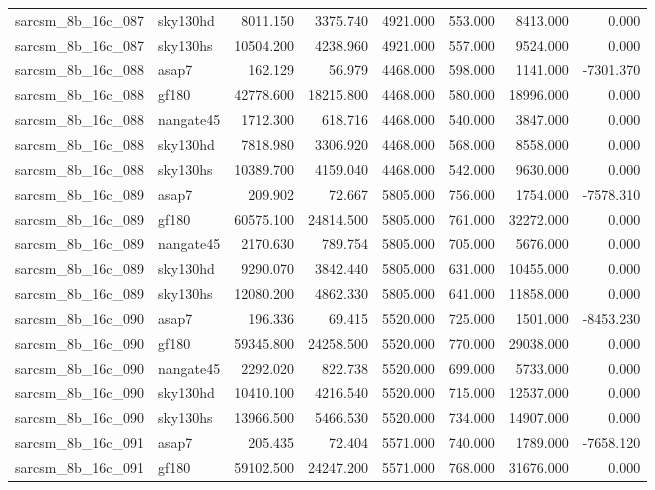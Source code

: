 \begin{tabular}{llrrrrrr}
sarcsm\_8b\_16c\_087 & sky130hd & 8011.150 & 3375.740 & 4921.000 & 553.000 & 8413.000 & 0.000 \\
sarcsm\_8b\_16c\_087 & sky130hs & 10504.200 & 4238.960 & 4921.000 & 557.000 & 9524.000 & 0.000 \\
sarcsm\_8b\_16c\_088 & asap7 & 162.129 & 56.979 & 4468.000 & 598.000 & 1141.000 & -7301.370 \\
sarcsm\_8b\_16c\_088 & gf180 & 42778.600 & 18215.800 & 4468.000 & 580.000 & 18996.000 & 0.000 \\
sarcsm\_8b\_16c\_088 & nangate45 & 1712.300 & 618.716 & 4468.000 & 540.000 & 3847.000 & 0.000 \\
sarcsm\_8b\_16c\_088 & sky130hd & 7818.980 & 3306.920 & 4468.000 & 568.000 & 8558.000 & 0.000 \\
sarcsm\_8b\_16c\_088 & sky130hs & 10389.700 & 4159.040 & 4468.000 & 542.000 & 9630.000 & 0.000 \\
sarcsm\_8b\_16c\_089 & asap7 & 209.902 & 72.667 & 5805.000 & 756.000 & 1754.000 & -7578.310 \\
sarcsm\_8b\_16c\_089 & gf180 & 60575.100 & 24814.500 & 5805.000 & 761.000 & 32272.000 & 0.000 \\
sarcsm\_8b\_16c\_089 & nangate45 & 2170.630 & 789.754 & 5805.000 & 705.000 & 5676.000 & 0.000 \\
sarcsm\_8b\_16c\_089 & sky130hd & 9290.070 & 3842.440 & 5805.000 & 631.000 & 10455.000 & 0.000 \\
sarcsm\_8b\_16c\_089 & sky130hs & 12080.200 & 4862.330 & 5805.000 & 641.000 & 11858.000 & 0.000 \\
sarcsm\_8b\_16c\_090 & asap7 & 196.336 & 69.415 & 5520.000 & 725.000 & 1501.000 & -8453.230 \\
sarcsm\_8b\_16c\_090 & gf180 & 59345.800 & 24258.500 & 5520.000 & 770.000 & 29038.000 & 0.000 \\
sarcsm\_8b\_16c\_090 & nangate45 & 2292.020 & 822.738 & 5520.000 & 699.000 & 5733.000 & 0.000 \\
sarcsm\_8b\_16c\_090 & sky130hd & 10410.100 & 4216.540 & 5520.000 & 715.000 & 12537.000 & 0.000 \\
sarcsm\_8b\_16c\_090 & sky130hs & 13966.500 & 5466.530 & 5520.000 & 734.000 & 14907.000 & 0.000 \\
sarcsm\_8b\_16c\_091 & asap7 & 205.435 & 72.404 & 5571.000 & 740.000 & 1789.000 & -7658.120 \\
sarcsm\_8b\_16c\_091 & gf180 & 59102.500 & 24247.200 & 5571.000 & 768.000 & 31676.000 & 0.000 \\

\end{tabular}
